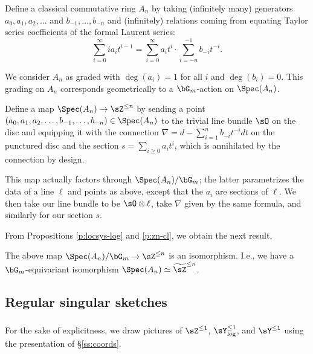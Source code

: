 Define a classical commutative ring $A_n$ by taking
(infinitely many) generators
$a_0,a_1,a_2,\ldots$ and $b_{-1},\ldots,b_{-n}$
and (infinitely) relations coming from equating Taylor series coefficients
of the formal Laurent series:
%
\[
\sum_{i=0}^{\infty} ia_it^{i-1} =
\sum_{i=0}^{\infty} a_it^i \cdot
\sum_{i=-n}^{-1} b_{-i}t^{-i}.
\]

We consider $A_n$ as graded with $\deg(a_i) = 1$
for all $i$ and $\deg(b_i) = 0$.
This grading on $A_n$ corresponds geometrically
to a $\bG_m$-action on $\Spec(A_n)$.

Define a map $\Spec(A_n) \to \sZ^{\leq n}$
by sending a point $(a_0,a_1,a_2,\ldots,b_{-1},\ldots,b_{-n})
\in \Spec(A_n)$ to the trivial line bundle
$\sO$ on the disc and equipping it with the connection
$\nabla = d-\sum_{i = 1}^n b_{-i} t^{-i} dt$ on the punctured
disc and the section $s = \sum_{i \geq 0} a_i t^i$,
which is annihilated by the connection by design.

This map actually factors through $\Spec(A_n)/\bG_m$; the
latter parametrizes the data of a line $\ell$ and
points as above, except that the $a_i$ are sections
of $\ell$. We then take our line bundle to be
$\sO \otimes \ell$, take $\nabla$ given by the same formula,
and similarly for our section $s$.

From Propositions \ref{p:locsys-log} and \ref{p:zn-cl},
we obtain the next result.

\begin{prop}
\notready\label{p:zn-coords}

The above map
$\Spec(A_n)/\bG_m \to \sZ^{\leq n}$ is an isomorphism.
I.e., we have a $\bG_m$-equivariant isomorphism
$\Spec(A_n) \simeq \widetilde{\sZ}^{\leq n}$.

\end{prop}




\subsection{Regular singular sketches}\label{ss:rs-sketch}

\subsubsection{}

For the sake of explicitness, we draw pictures of $\sZ^{\leq 1}$,
$\sY_{\log}^{\leq 1}$, and $\sY^{\leq 1}$ using
the presentation of \S \ref{ss:coords}.


